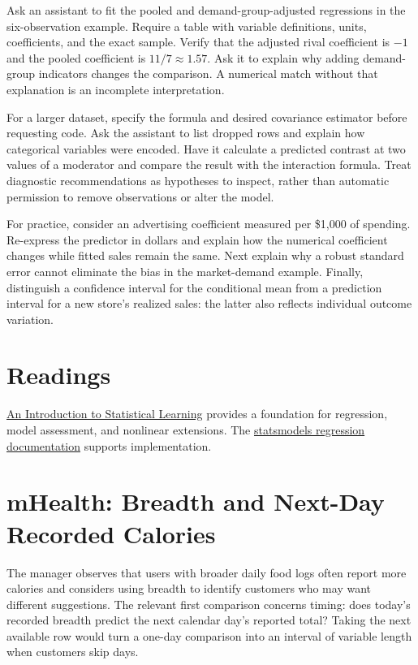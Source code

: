 \noindent Ask an assistant to fit the pooled and demand-group-adjusted regressions
in the six-observation example. Require a table with variable
definitions, units, coefficients, and the exact sample. Verify that the
adjusted rival coefficient is \(-1\) and the pooled coefficient is
\(11/7\approx1.57\). Ask it to explain why adding demand-group
indicators changes the comparison. A numerical match without that
explanation is an incomplete interpretation.

For a larger dataset, specify the formula and desired covariance
estimator before requesting code. Ask the assistant to list dropped rows
and explain how categorical variables were encoded. Have it calculate a
predicted contrast at two values of a moderator and compare the result
with the interaction formula. Treat diagnostic recommendations as
hypotheses to inspect, rather than automatic permission to remove
observations or alter the model.

For practice, consider an advertising coefficient measured per \$1,000
of spending. Re-express the predictor in dollars and explain how the
numerical coefficient changes while fitted sales remain the same. Next
explain why a robust standard error cannot eliminate the bias in the
market-demand example. Finally, distinguish a confidence interval for
the conditional mean from a prediction interval for a new store's
realized sales: the latter also reflects individual outcome variation.

\hypertarget{M03-readings}{%
\section{Readings}\label{M03-readings}}

\noindent \href{https://www.statlearning.com/}{An Introduction to Statistical
Learning} provides a foundation for regression, model assessment, and
nonlinear extensions. The
\href{https://www.statsmodels.org/stable/regression.html}{statsmodels
regression documentation} supports implementation.

\hypertarget{M03-mhealth-breadth-and-next-day-recorded-calories}{%
\section{mHealth: Breadth and Next-Day Recorded
Calories}\label{M03-mhealth-breadth-and-next-day-recorded-calories}}

\noindent The manager observes that users with broader daily food logs often
report more calories and considers using breadth to identify customers
who may want different suggestions. The relevant first comparison
concerns timing: does today's recorded breadth predict the next calendar
day's reported total? Taking the next available row would turn a one-day
comparison into an interval of variable length when customers skip days.

